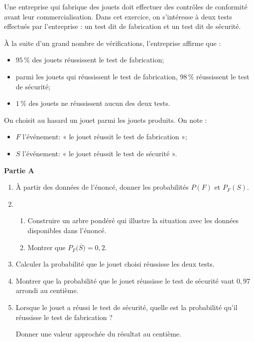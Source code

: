 Une entreprise qui fabrique des jouets doit effectuer des contrôles de conformité avant leur commercialisation. Dans cet exercice, on s'intéresse à deux tests effectués par l'entreprise : un test dit de fabrication et un test dit de sécurité.

À la suite d'un grand nombre de vérifications, l'entreprise affirme que :

\begin{itemize}
	\item $95\,\%$ des jouets réussissent le test de fabrication;
	\item parmi les jouets qui réussissent le test de fabrication, $98\,\%$ réussissent le test de sécurité;
	\item $1\,\%$ des jouets ne réussissent aucun des deux tests.
\end{itemize}

On choisit au hasard un jouet parmi les jouets produits. On note :
\begin{itemize}
	\item $F$ l'événement: « le jouet réussit le test de fabrication »;
	\item $S$ l'événement: « le jouet réussit le test de sécurité ».
\end{itemize}

\textbf{Partie A}

\begin{enumerate}
	\item À partir des données de l'énoncé, donner les probabilités $P(F)$ et $P_{F}(S)$.
	\item
	\begin{enumerate}
		\item Construire un arbre pondéré qui illustre la situation avec les données disponibles dans l'énoncé.
		\item Montrer que $P_{\overline{F}}\big(\overline{S}\big)=0,2$.
	\end{enumerate}
	\item Calculer la probabilité que le jouet choisi réussisse les deux tests.
	\item Montrer que la probabilité que le jouet réussisse le test de sécurité vaut $0,97$ arrondi au centième.
	\item Lorsque le jouet a réussi le test de sécurité, quelle est la probabilité qu'il réussisse le test de fabrication ?
	
	Donner une valeur approchée du résultat au centième.
\end{enumerate}

